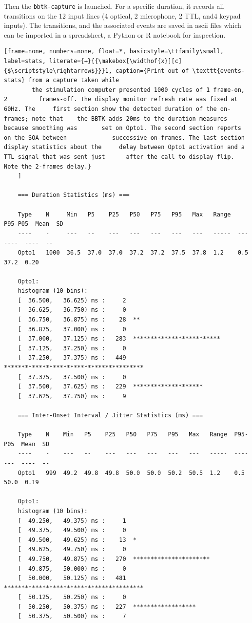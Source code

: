 \documentclass[jou,a4paper]{apa7}
\begin{document}
Then the \texttt{bbtk-capture} is launched. For a specific duration, it records all transitions on the 12 input lines (4 optical, 2 microphone, 2 TTL, and4 keypad inputs). The transitions, and the associated  events are saved in ascii files which can be imported in a spreadsheet, a Python or R notebook for inspection. 



\begin{lstlisting}[frame=none, numbers=none, float=*, basicstyle=\ttfamily\small, label=stats, literate={→}{{\makebox[\widthof{x}][c]{$\scriptstyle\rightarrow$}}}1, caption={Print out of \texttt{events-stats} from a capture taken while
		the stimulation computer presented 1000 cycles of 1 frame-on, 2     	frames-off. The display monitor refresh rate was fixed at 60Hz. The    	first section show the detected duration of the on-frames; note that    the BBTK adds 20ms to the duration measures because smoothing was     	set on Opto1. The second section reports on the SOA between     		successive on-frames. The last section display statistics about the     delay between Opto1 activation and a TTL signal that was sent just     	after the call to display flip. Note the 2-frames delay.}
	]
	
	=== Duration Statistics (ms) ===
	
	Type    N     Min   P5    P25   P50   P75   P95   Max   Range  P95-P05  Mean  SD
	----    -     ---   --    ---   ---   ---   ---   ---   -----  -------  ----  --
	Opto1   1000  36.5  37.0  37.0  37.2  37.2  37.5  37.8  1.2    0.5      37.2  0.20
	
	Opto1:
	histogram (10 bins):
	[  36.500,   36.625) ms :     2
	[  36.625,   36.750) ms :     0
	[  36.750,   36.875) ms :    28  **
	[  36.875,   37.000) ms :     0
	[  37.000,   37.125) ms :   283  *************************
	[  37.125,   37.250) ms :     0
	[  37.250,   37.375) ms :   449  ****************************************
	[  37.375,   37.500) ms :     0
	[  37.500,   37.625) ms :   229  ********************
	[  37.625,   37.750) ms :     9
	
	=== Inter-Onset Interval / Jitter Statistics (ms) ===
	
	Type    N    Min   P5    P25   P50   P75   P95   Max   Range  P95-P05  Mean  SD
	----    -    ---   --    ---   ---   ---   ---   ---   -----  -------  ----  --
	Opto1   999  49.2  49.8  49.8  50.0  50.0  50.2  50.5  1.2    0.5      50.0  0.19
	
	Opto1:
	histogram (10 bins):
	[  49.250,   49.375) ms :     1
	[  49.375,   49.500) ms :     0
	[  49.500,   49.625) ms :    13  *
	[  49.625,   49.750) ms :     0
	[  49.750,   49.875) ms :   270  **********************
	[  49.875,   50.000) ms :     0
	[  50.000,   50.125) ms :   481  ****************************************
	[  50.125,   50.250) ms :     0
	[  50.250,   50.375) ms :   227  ******************
	[  50.375,   50.500) ms :     7
	

\end{lstlisting}
\end{document}
